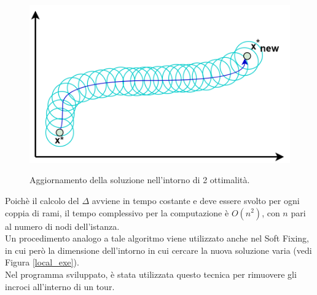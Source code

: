 \begin{figure}[H] 
\begin{center} 
  \includegraphics[scale=0.3]{Images/two_optimality}\\ 
  \caption{\footnotesize{Aggiornamento della soluzione nell'intorno di 2 ottimalità.}}
  \label{two_optimality}
\end{center}
\end{figure}
Poichè il calcolo del $\Delta$ avviene in tempo costante e deve essere svolto per ogni coppia di rami, il tempo complessivo per la computazione è $O(n^2)$, con $n$ pari al numero di nodi dell'istanza.\\
Un procedimento analogo a tale algoritmo viene utilizzato anche nel Soft Fixing, in cui però la dimensione dell'intorno in cui cercare la nuova soluzione varia (vedi Figura \ref{local_exe}).\\
Nel programma sviluppato, è stata utilizzata questo tecnica per rimuovere gli incroci all'interno di un tour.
 
